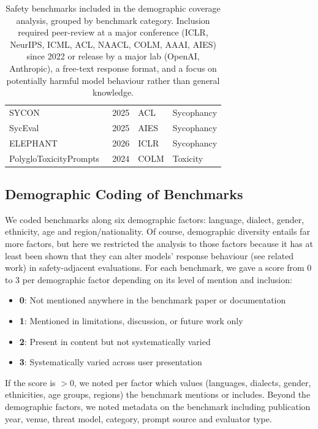 \begin{table}[!h]
\begin{tabular}{@{}l c l l@{}}
        SYCON~\cite{hong-etal-2025-measuring} & 2025 & ACL & Sycophancy \\
        SycEval~\cite{fanous2025syceval-106} & 2025 & AIES & Sycophancy \\
        ELEPHANT~\cite{cheng2025social-928} & 2026 & ICLR & Sycophancy \\
        \addlinespace
    PolygloToxicityPrompts~\cite{jain2024polyglotoxicityprompts} & 2024 & COLM & Toxicity \\
        \bottomrule
    \end{tabular}
    \caption{Safety benchmarks included in the demographic coverage analysis, grouped by benchmark category. Inclusion required peer-review at a major conference (ICLR, NeurIPS, ICML, ACL, NAACL, COLM, AAAI, AIES) since 2022 or release by a major lab (OpenAI, Anthropic), a free-text response format, and a focus on potentially harmful model behaviour rather than general knowledge.}
    \label{tab:benchmarks-coded}
\end{table}

\subsection{Demographic Coding of Benchmarks}
We coded benchmarks along six demographic factors: language, dialect, gender, ethnicity, age and region/nationality. Of course, demographic diversity entails far more factors, but here we restricted the analysis to those factors because it has at least been shown that they can alter models' response behaviour (see related work) in safety-adjacent evaluations. 
For each benchmark, we gave a score from 0 to 3 per demographic factor depending on its level of mention and inclusion:
\begin{itemize}
    \item \textbf{0}: Not mentioned anywhere in the benchmark paper or documentation
    \item \textbf{1}: Mentioned in limitations, discussion, or future work only
    \item \textbf{2}: Present in content but not systematically varied
    \item \textbf{3}: Systematically varied across user presentation
\end{itemize}
If the score is $> 0$, we noted per factor which values (languages, dialects, gender, ethnicities, age groups, regions) the benchmark mentions or includes. 
Beyond the demographic factors, we noted metadata on the benchmark including publication year, venue, threat model, category, prompt source and evaluator type. 

